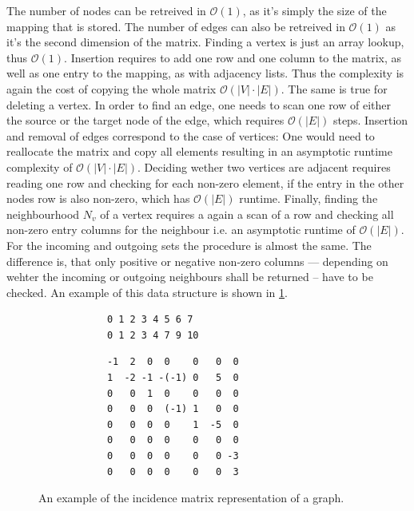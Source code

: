         The number of nodes can be retreived in $\mathcal{O}(1)$, as it's simply the size of the mapping that is stored.
        The number of edges can also be retreived in $\mathcal{O}(1)$ as it's the second dimension of the matrix.
        Finding a vertex is just an array lookup, thus $\mathcal{O}(1)$.
        Insertion requires to add one row and one column to the matrix, as well as one entry to the mapping, as with adjacency lists. 
        Thus the complexity is again the cost of copying the whole matrix $\mathcal{O}(|V| \cdot |E|)$. 
        The same is true for deleting a vertex.         
        In order to find an edge, one needs to scan one row of either the source or the target node of the edge, which requires $\mathcal{O}(|E|)$ steps.
        Insertion and removal of edges correspond to the case of vertices: 
        One would need to reallocate the matrix and copy all elements resulting in an asymptotic runtime complexity of $\mathcal{O}(|V| \cdot |E|)$. 
        Deciding wether two vertices are adjacent requires reading one row and checking for each non-zero element, if the entry in the other nodes row is also non-zero, which has $\mathcal{O}(|E|)$ runtime.        
        Finally, finding the neighbourhood $N_v$ of a vertex requires a again a scan of a row and checking all non-zero entry columns for the neighbour i.e. an asymptotic runtime of $\mathcal{O}(|E|)$. 
        For the incoming and outgoing sets the procedure is almost the same. 
        The difference is, that only positive or negative non-zero columns --- depending on wehter the incoming or outgoing neighbours shall be returned -- have to be checked.
        An example of this data structure is shown in \ref{incm}.
        
        \begin{figure}[htp]
         \begin{center}
         \begin{verbatim}
            0 1 2 3 4 5 6 7
            0 1 2 3 4 7 9 10
          \end{verbatim}
          \begin{verbatim}
            -1  2  0  0    0   0  0
            1  -2 -1 -(-1) 0   5  0
            0   0  1  0    0   0  0
            0   0  0  (-1) 1   0  0
            0   0  0  0    1  -5  0
            0   0  0  0    0   0  0
            0   0  0  0    0   0 -3
            0   0  0  0    0   0  3
          \end{verbatim}
         \end{center}
         \caption{An example of the incidence matrix representation of a graph.}
         \label{incm}
        \end{figure}
        
